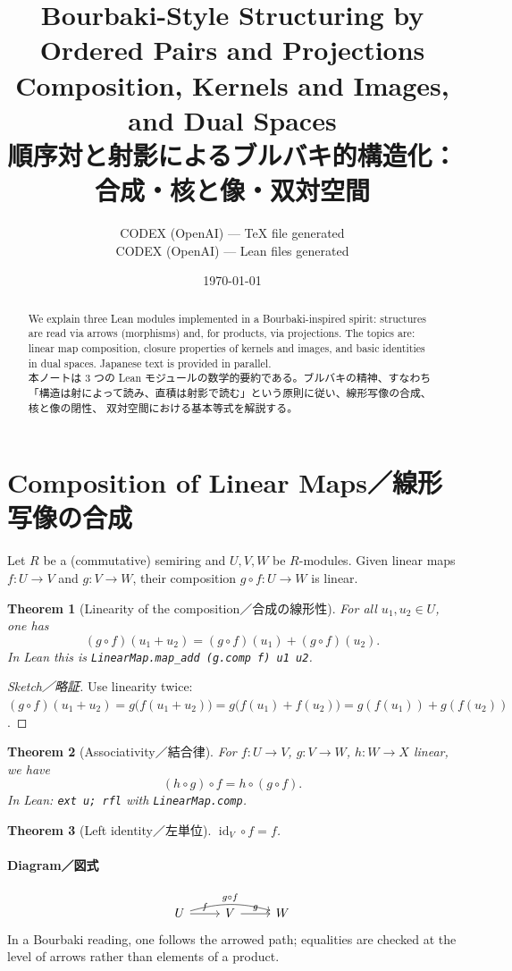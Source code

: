 \documentclass[11pt]{article}
\title{Bourbaki-Style Structuring by Ordered Pairs and Projections\\
Composition, Kernels and Images, and Dual Spaces\\[2mm]
順序対と射影によるブルバキ的構造化：合成・核と像・双対空間}
\author{CODEX (OpenAI) --- TeX file generated\\CODEX (OpenAI) --- Lean files generated}
\date{\today}
\theoremstyle{definition}
\theoremstyle{plain}
\newtheorem{theorem}{Theorem}
\theoremstyle{remark}
\begin{document}
\maketitle

\begin{abstract}
We explain three Lean modules implemented in a Bourbaki-inspired spirit: structures are read
via arrows (morphisms) and, for products, via projections. The topics are: linear map
composition, closure properties of kernels and images, and basic identities in dual spaces.
Japanese text is provided in parallel.\\
本ノートは 3 つの Lean モジュールの数学的要約である。ブルバキの精神、すなわち
「構造は射によって読み、直積は射影で読む」という原則に従い、線形写像の合成、核と像の閉性、
双対空間における基本等式を解説する。
\end{abstract}

\tableofcontents

\section{Composition of Linear Maps／線形写像の合成}

Let $R$ be a (commutative) semiring and $U,V,W$ be $R$-modules. Given linear maps
$f:U\to V$ and $g:V\to W$, their composition $g\circ f:U\to W$ is linear.

\begin{theorem}[Linearity of the composition／合成の線形性]
For all $u_1,u_2\in U$, one has
\[
 (g\circ f)(u_1+u_2) = (g\circ f)(u_1) + (g\circ f)(u_2).
\]
In Lean this is \verb|LinearMap.map_add (g.comp f) u1 u2|.
\end{theorem}

\begin{proof}[Sketch／略証]
Use linearity twice: $(g\circ f)(u_1+u_2)=g\big(f(u_1+u_2)\big)
=g\big(f(u_1)+f(u_2)\big)=g(f(u_1))+g(f(u_2))$.
\end{proof}

\begin{theorem}[Associativity／結合律]
For $f:U\to V$, $g:V\to W$, $h:W\to X$ linear, we have
\[
 (h\circ g)\circ f = h\circ (g\circ f).
\]
In Lean: \verb|ext u; rfl| with \verb|LinearMap.comp|.
\end{theorem}

\begin{theorem}[Left identity／左単位]
\(\operatorname{id}_V\circ f = f\).
\end{theorem}

\paragraph{Diagram／図式}
\[
\begin{tikzcd}
U \arrow[r, "f"] \arrow[rr, bend left=15, "g\circ f"] & V \arrow[r, "g"] & W
\end{tikzcd}
\]
In a Bourbaki reading, one follows the arrowed path; equalities are checked at the level of
arrows rather than elements of a product.
\end{document}

